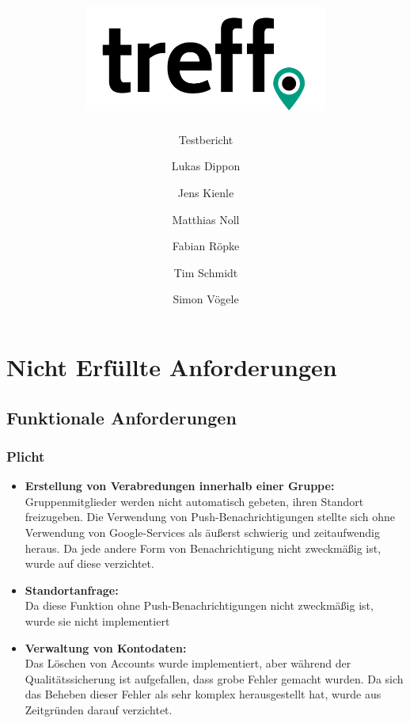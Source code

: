 \documentclass[parskip=full,11pt]{scrartcl}
\title{\includegraphics[width = 80mm]{images/logo_crop.png}}
\subtitle{\huge Testbericht}
\author{Lukas Dippon
        \and Jens Kienle
        \and Matthias Noll
        \and Fabian Röpke
        \and Tim Schmidt
        \and Simon Vögele}
\begin{document}
\maketitle
\thispagestyle{empty} %

\pagebreak
\tableofcontents

\pagebreak
\section{Nicht Erfüllte Anforderungen}
	\subsection{Funktionale Anforderungen}
		\subsubsection{Plicht}
			\begin{itemize}
                \item \textbf{Erstellung von Verabredungen innerhalb einer Gruppe:}\\
											\label{notification}Gruppenmitglieder werden nicht
                      automatisch gebeten, ihren Standort freizugeben.
                      Die Verwendung von Push-Benachrichtigungen stellte
                      sich ohne Verwendung von Google-Services als
                      äußerst schwierig und zeitaufwendig heraus. Da jede
                      andere Form von Benachrichtigung nicht zweckmäßig
                      ist, wurde auf diese verzichtet.
                \item \textbf{Standortanfrage:}\\
											\label{requestPosition}Da diese Funktion ohne
											Push-Benachrichtigungen nicht zweckmäßig ist,
											wurde sie nicht implementiert
                \item \textbf{Verwaltung von Kontodaten:}\\
                      \label{deleteaccount}Das Löschen von Accounts wurde
                      implementiert, aber während der Qualitätssicherung
                      ist aufgefallen, dass grobe Fehler gemacht wurden.
                      Da sich das Beheben dieser Fehler als sehr komplex
                      herausgestellt hat, wurde aus Zeitgründen darauf
                      verzichtet.
			\end{itemize}
\end{document}
